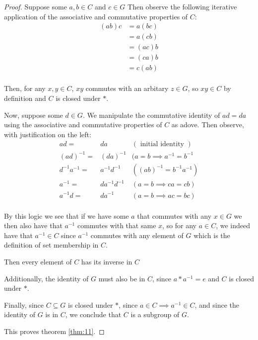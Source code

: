 \documentclass[12pt]{article}
\begin{document}
\begin{proof}
	Suppose
	some $a,b \in C$ and $c \in G$
	Then observe the following iterative application of
	the associative and commutative properties of $C$:
	\begin{align}
		(ab)c & = a(bc) \\
		      & = a(cb) \\
		      & = (ac)b \\
		      & = (ca)b \\
		      & = c(ab) \\
	\end{align}

	Then,
	for any $x,y \in C$,
	$xy$ commutes with an arbitary $z \in G$,
	so $xy \in C$ by definition
	and $C$ is closed under $*$.

	Now,
	suppose some $d \in G$.
	We manipulate the commutative identity
	of $ad = da$
	using the associative and commutative
	properties of $C$ as adove.
	Then observe, with justification on the left: 
	\begin{align}
		ad = & da  & (\textrm{ initial identity })\\
		(ad)^{-1} = & (da)^{-1} & (a = b \implies a^{-1} = b^{-1} \\
		d^{-1} a^{-1} = & a^{-1} d^{-1} & ((ab)^{-1} = b^{-1} a^{-1}) \\
		a^{-1} = & d a^{-1} d^{-1} & (a = b \implies ca = cb) \\
		a^{-1} d = & d a^{-1}  & (a = b \implies ac = bc) \\
	\end{align}

	By this logic
	we see that if we have some $a$
	that commutes with any $x \in G$
	we then also have that $a^{-1}$
	commutes with that same $x$,
	so for any $a \in C$,
	we indeed have that $a^{-1} \in C$
	since $a^{-1}$ commutes
	with any element of $G$
	which is the definition of
	set membership in $C$.

	Then every element of $C$ has its inverse in $C$

	Additionally, the identity of $G$
	must also be in $C$,
	since $a * a^{-1} = e$
	and $C$ is closed under $*$.

	
	Finally,
	since $C \subseteq G$ is closed under $*$,
	since $a \in C \implies a^{-1} \in C$,
	and since the identity of $G$ is in $C$,
	we conclude that $C$ is a subgroup of $G$.

	This proves theorem \ref{thm:11}.
\end{proof}
\end{document}

